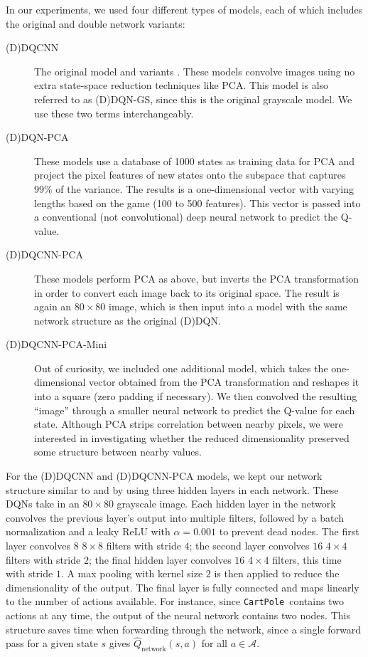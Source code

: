 \documentclass[11pt]{article}
\newcommand{\cp}{\texttt{CartPole}}
\begin{document}
In our experiments, we used four different types of models, each of which includes the original and double network variants: 

\begin{description}
    \item[(D)DQCNN] The original model \cite{mnih2013playing, mnih2015human} and variants \cite{van2016deep}. These models convolve images using no extra state-space reduction techniques like PCA. This model is also referred to as (D)DQN-GS, since this is the original grayscale model. We use these two terms interchangeably.
    
    \item[(D)DQN-PCA] These models use a database of 1000 states as training data for PCA and project the pixel features of new states onto the subspace that captures 99\% of the variance. The results is a one-dimensional vector with varying lengths based on the game (100 to 500 features). This vector is passed into a conventional (not convolutional) deep neural network to predict the Q-value.
    
    \item[(D)DQCNN-PCA] These models perform PCA as above, but inverts the PCA transformation in order to convert each image back to its original space. The result is again an $80 \times 80$ image, which is then input into a model with the same network structure as the original (D)DQN.
    
    \item[(D)DQCNN-PCA-Mini] Out of curiosity, we included one additional model, which takes the one-dimensional vector obtained from the PCA transformation and reshapes it into a square (zero padding if necessary). We then convolved the resulting ``image'' through a smaller neural network to predict the Q-value for each state. Although PCA strips correlation between nearby pixels, we were interested in investigating whether the reduced dimensionality preserved some structure between nearby values.
\end{description}

For the (D)DQCNN and (D)DQCNN-PCA models, we kept our network structure similar to \cite{mnih2013playing} and \cite{mnih2015human} by using three hidden layers in each network. These DQNs take in an $80 \times 80$ grayscale image. Each hidden layer in the network convolves the previous layer's output into multiple filters, followed by a batch normalization and a leaky ReLU with $\alpha = 0.001$ to prevent dead nodes. The first layer convolves $8$ $8 \times 8$ filters with stride $4$; the second layer convolves $16$ $4 \times 4$ filters with stride $2$; the final hidden layer convolves $16$ $4 \times 4$ filters, this time with stride $1$. A max pooling with kernel size $2$ is then applied to reduce the dimensionality of the output. The final layer is fully connected and maps linearly to the number of actions available. For instance, since \cp~contains two actions at any time, the output of the neural network contains two nodes. This structure saves time when forwarding through the network, since a single forward pass for a given state $s$ gives $\hat{Q}_\text{network}(s, a)$ for all $a \in \mathcal{A}$.
\end{document}
